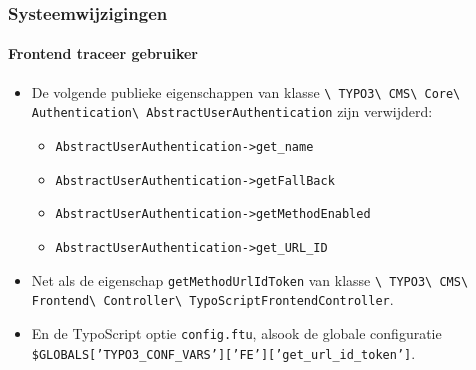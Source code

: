
\begin{frame}[fragile]
	\frametitle{Systeemwijzigingen}
	\framesubtitle{Frontend traceer gebruiker}

	\begin{itemize}

		\item De volgende publieke eigenschappen van klasse\newline
			\smaller\texttt{\textbackslash
				TYPO3\textbackslash
				CMS\textbackslash
				Core\textbackslash
				Authentication\textbackslash
				AbstractUserAuthentication}
			\normalsize\newline
			zijn verwijderd:

			\begin{itemize}\smaller
				\item \texttt{AbstractUserAuthentication->get\_name}
				\item \texttt{AbstractUserAuthentication->getFallBack}
				\item \texttt{AbstractUserAuthentication->getMethodEnabled}
				\item \texttt{AbstractUserAuthentication->get\_URL\_ID}
			\end{itemize}\normalsize

		\item Net als de eigenschap \texttt{getMethodUrlIdToken} van klasse\newline
			\smaller\texttt{\textbackslash
				TYPO3\textbackslash
				CMS\textbackslash
				Frontend\textbackslash
				Controller\textbackslash
				TypoScriptFrontendController}.
			\normalsize

		\item En de TypoScript optie \texttt{config.ftu},
			alsook de globale configuratie
			{\fontsize{8}{8} \selectfont \texttt{\$GLOBALS['TYPO3\_CONF\_VARS']['FE']['get\_url\_id\_token']}.}

	\end{itemize}

\end{frame}


